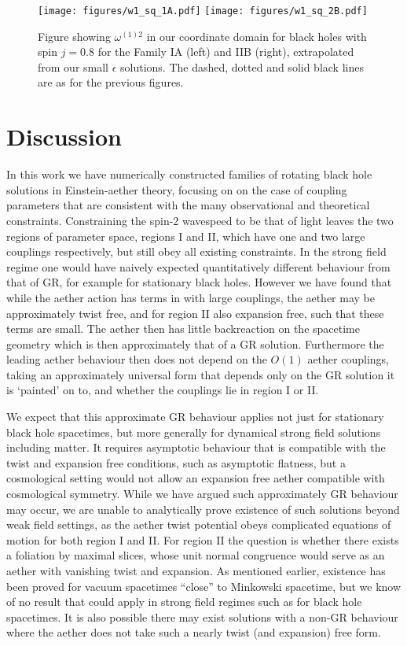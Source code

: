 \documentclass[12pt]{article}
\numberwithin{equation}{section}
\begin{document}
\begin{figure}
\centerline{  
  \texttt{[image: figures/w1\_sq\_1A.pdf]}
  \texttt{[image: figures/w1\_sq\_2B.pdf]}
  }
  \caption{\label{fig:leadingtwist}
  Figure showing $\omega^{(1)2}$ in our coordinate domain for black holes with spin $j = 0.8$ for the Family IA (left) and IIB (right), extrapolated from our small $\epsilon$ solutions. The dashed, dotted and solid black lines are as for the previous figures.
  }
\end{figure}



\section{Discussion}
\label{sec:discussion}


In this work we have numerically constructed 
families of rotating black hole solutions in Einstein-aether theory, focusing on 
on the case of coupling parameters that are
consistent with the many observational and theoretical constraints.
Constraining the spin-2 wavespeed to be that of light leaves the two regions of parameter space, regions I and II, which have one and two large couplings respectively,
but still obey all existing constraints.
In the strong field regime one would have naively expected quantitatively different behaviour from that of GR, for example for stationary black holes.
However we have found 
that while the aether action has terms in with large couplings, the aether may be approximately twist free, and for region II also expansion free, such that these terms are small. The aether then has little backreaction on the spacetime geometry which is then approximately that of a GR solution. Furthermore the leading aether behaviour then does not depend on the  $O(1)$ 
aether couplings, taking an approximately universal form that depends only on the GR solution it is `painted' on to, and whether the couplings lie in
region I or II.

We expect that this approximate GR behaviour applies not just for stationary black hole spacetimes, but more generally for dynamical strong field solutions including  matter. It requires asymptotic behaviour that is compatible with the twist and expansion free conditions, 
such as 
asymptotic flatness, but a cosmological setting would not allow an expansion free aether compatible with cosmological symmetry. 
While we have argued such approximately GR behaviour may occur, we are unable to analytically prove existence of such solutions beyond weak field settings, as the aether twist potential obeys complicated equations of motion for both region I and II. 
For region II the question is whether 
there exists a foliation by maximal slices, whose unit normal
congruence would serve as an aether with vanishing 
twist and expansion. As mentioned earlier, existence has been proved for vacuum spacetimes ``close'' to Minkowski spacetime, but we know of no result that could apply in strong field regimes such as for black hole spacetimes.
It is also possible there may  exist solutions with a non-GR behaviour where the aether does not take such a nearly twist (and expansion) free form. 
\end{document}
